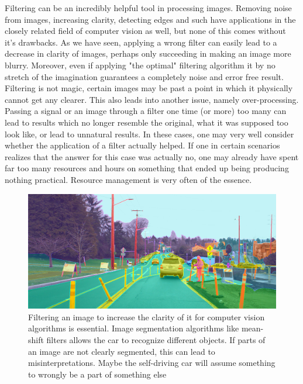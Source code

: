 \documentclass[twoside,a4paper,article]{combine}
\begin{document}
Filtering can be an incredibly helpful tool in processing images. Removing noise from images, increasing clarity, detecting edges and such have applications in the closely related field of computer vision as well, but none of this comes without it's drawbacks. As we have seen, applying a wrong filter can easily lead to a decrease in clarity of images, perhaps only succeeding in making an image more blurry. Moreover, even if applying "the optimal" filtering algorithm it by no stretch of the imagination guarantees a completely noise and error free result. Filtering is not magic, certain images may be past a point in which it physically cannot get any clearer. This also leads into another issue, namely over-processing. Passing a signal or an image through a filter one time (or more) too many can lead to results which no longer resemble the original, what it was supposed too look like, or lead to unnatural results. In these cases, one may very well consider whether the application of a filter actually helped. If one in certain scenarios realizes that the answer for this case was actually no, one may already have spent far too many resources and hours on something that ended up being producing nothing practical. Resource management is very often of the essence.
\begin{figure}[H]
    \centering
    \includegraphics[width=1\linewidth]{csvision.jpg}
    \caption{Filtering an image to increase the clarity of it for computer vision algorithms is essential. Image segmentation algorithms like mean-shift filters allows the car to recognize different objects. If parts of an image are not clearly segmented, this can lead to misinterpretations. Maybe the self-driving car will assume something to wrongly be a part of something else}
    \label{fig:enter-label}
\end{figure}
\end{document}
